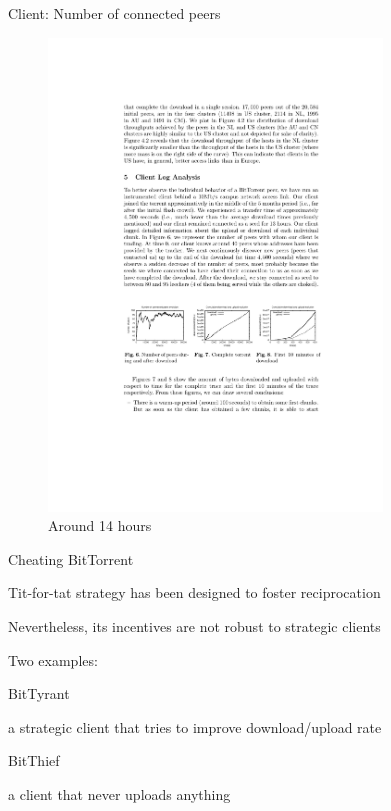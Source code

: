 \begin{frame}{Client: Number of connected peers}

\begin{figure}	
	\includegraphics[width=0.79\textwidth]{figs/10/bt-fig5}
	\caption{Around 14 hours}
\end{figure}	
	
\end{frame}

\begin{frame}[shrink]{Cheating BitTorrent}

\BIL
\item Tit-for-tat strategy has been designed to foster reciprocation
\item Nevertheless, its incentives are not robust to strategic clients
\item Two examples:
	\BI
	\item \alert{BitTyrant}
		\BI
		\item a strategic client that tries to improve download/upload rate
		\EI
	\item \alert{BitThief}
		\BI
		\item a client that never uploads anything
		\EI
	\EI
\EIL

\begin{Bib}
{\scriptsize
\BI
\item	{}
\item 	{}
\EI
}
\end{Bib}

\end{frame}

